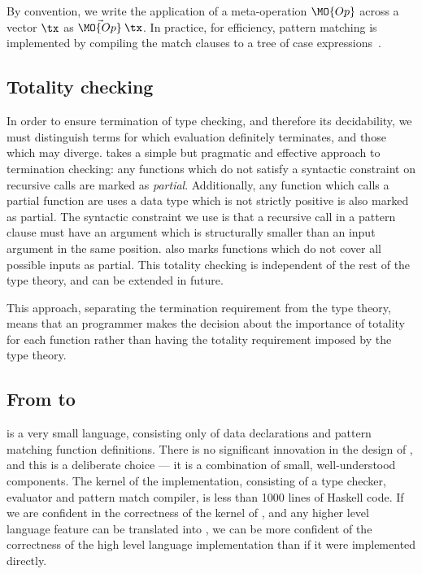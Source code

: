 By convention, we write the application of a meta-operation $\MO{Op}$ 
across a vector $\tx$ as $\vec{\MO{Op}}\:\tx$.
In practice, for efficiency, pattern matching is implemented by compiling the match clauses to
a tree of case expressions~\cite{Augustsson1985}. 

\subsection{Totality checking}

In order to ensure termination of type checking, and therefore its decidability,
we must distinguish terms for which evaluation definitely terminates, and
those which may diverge. \TT{} takes a simple but pragmatic and
effective approach to termination
checking: any functions which do not satisfy a syntactic constraint on recursive
calls are marked as \emph{partial}. Additionally, any function which calls a partial
function are uses a data type which is not strictly positive is also marked as
partial. The syntactic constraint we use is that a recursive call in a pattern
clause must have an argument which is structurally smaller than an input argument
in the same position. \TT{} also marks functions which do not cover all possible
inputs as partial. This totality checking is independent of the rest of the type
theory, and can be extended in future.

This approach, separating the termination requirement from the type theory, means that
an \Idris{} programmer makes the decision about the importance of totality for each
function rather than having the totality requirement imposed by the type theory.

\subsection{From \Idris{} to \TT{}}

\TT{} is a very small language, consisting only of data declarations and pattern matching
function definitions. There is no significant innovation in the design of \TT{}, and this
is a deliberate choice --- it is a combination of small, well-understood components.
The kernel of the \TT{} implementation, consisting of a type checker, evaluator and
pattern match compiler, is less than 1000 lines of Haskell code. If we are confident
in the correctness of the kernel of \TT{}, and any higher level language feature
can be translated into \TT{}, we can be more confident of the correctness of the high
level language implementation than if it were implemented directly.


